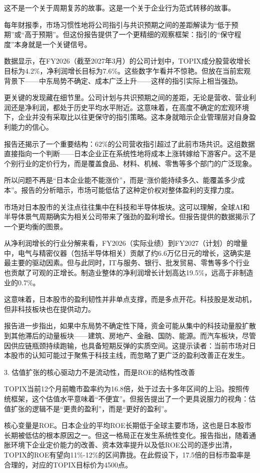 \documentclass[11pt]{ctexart}
\begin{document}
这不是一个关于周期复苏的故事。这是一个关于企业行为范式转移的故事。

每年财报季，市场习惯性地将公司指引与共识预期之间的差距解读为“低于预期”或“高于预期”。但这份报告提供了一个更精细的观察框架：指引的“保守程度”本身就是一个关键信号。

数据显示，在FY2026（截至2027年3月）的公司计划中，TOPIX成分股营收增长目标为4.2\%，净利润增长目标为7.6\%。这些数字乍看并不惊艳。但放在当前宏观背景下——中东局势不确定、成本广泛上升——这样的指引实际上相当强劲。

更关键的发现藏在细节里。公司计划与共识预期之间的差距，无论是营收、营业利润还是净利润，都处于历史平均水平附近。这意味着，在高度不确定的宏观环境下，企业并没有采取比以往更保守的指引策略。这本身就暗示企业管理层对自身盈利能力的信心。

报告还揭示了一个重要结构：62\%的公司营收指引超过了此前市场共识。这组数据直接指向一个判断——日本企业正在系统性地将成本上涨转嫁给下游客户。这不是个别行业的定价行为，而是覆盖食品、材料、机械、零售等多个部门的广泛现象。

所以问题不再是“日本企业能不能涨价”，而是“涨价能持续多久、能覆盖多少成本”。报告的分析暗示，市场可能低估了这种定价权对整体盈利的支撑力度。

市场对日本股市的关注点往往集中在科技和半导体板块。这可以理解，全球AI和半导体景气周期确实为相关公司带来了强劲的盈利增长。但报告提供的数据揭示了一个更均衡的图景。

从净利润增长的行业分解来看，FY2026（实际业绩）到FY2027（计划）的增量中，电气与精密仪器（包括半导体相关）贡献了约6.6万亿日元的增长，这确实是最主要的驱动因素。但与此同时，IT与服务、银行、批发贸易、零售等多个行业也贡献了可观的正增长。制造业整体的净利润增长计划高达19.5\%，远高于非制造业的0.7\%。

这意味着，日本股市的盈利韧性并非单点支撑，而是多点开花。科技股是发动机，但非科技板块也在提供动力。

报告进一步指出，如果中东局势不确定性下降，资金可能从集中的科技动量股扩散到其他滞后的动量板块——建筑、房地产、金融、国防、能源。而汽车板块，尽管因供应链瓶颈持续跑输，也具备短期反弹的实质空间。这提示读者：当前市场对日本股市的认知可能过于聚焦于科技主线，而忽略了更广泛的盈利改善正在发生。

3. 估值扩张的核心驱动力不是流动性，而是ROE的结构性改善

TOPIX当前12个月前瞻市盈率约为16.8倍，处于过去十多年区间的上沿。按照传统框架，这个估值水平意味着“不便宜”。但报告提出了一个更具说服力的视角：估值扩张的逻辑不是“更贵的盈利”，而是“更好的盈利”。

核心变量是ROE。日本企业的平均ROE长期低于全球主要市场，这也是日本股市长期被低估的根本原因之一。但这一格局正在发生系统性变化。报告指出，随着通胀环境下企业定价能力的改善、资本效率提升以及低ROE公司的逐步出清，TOPIX的ROE有望向11\%-12\%的区间靠拢。在此假设下，17.5倍的目标市盈率是合理的，对应的TOPIX目标价为4500点。
\end{document}

